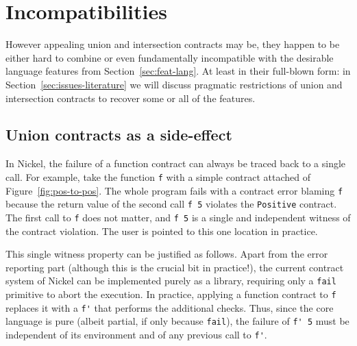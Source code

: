 \documentclass[sigplan,10pt,review,anonymous]{acmart}
\newcommand{\unsure}[2][1=]{}
\newcommand{\nickel}[1]{\lstinline[language=nickel]{#1}}
\begin{document}
\section{Incompatibilities}
\label{sec:issues-sem}

However appealing union and intersection contracts may be, they happen to be
either hard to combine or even fundamentally incompatible with the desirable
language features from Section~\ref{sec:feat-lang}. At least in their full-blown
form: in Section~\ref{sec:issues-literature} we will discuss pragmatic
restrictions of union and intersection contracts to recover some or all of the
features.

\subsection{Union contracts as a side-effect}

In \unsure{Maybe specify its Nickel without Union or inter}Nickel,
the failure of a function contract can always be traced back to a
single call. For example, take the function \nickel{f} with a simple contract
attached of Figure~\ref{fig:pos-to-pos}. The whole program fails with a contract
error blaming \nickel{f} because the return value of the second call \nickel{f 5}
violates the \nickel{Positive} contract. The first call to \nickel{f} does
not matter, and \nickel{f 5} is a single and independent witness of the contract
violation. The user is pointed to this one location in practice.

This single witness property can be justified as follows. Apart from the error
reporting part (although this is the crucial bit in practice!), the current
contract system of Nickel can be implemented purely as a library, requiring only
a \nickel{fail} primitive to abort the execution. In practice, applying a
function contract to \nickel{f} replaces it with a \nickel{f'} that performs the
additional checks. Thus, since the core language is pure (albeit
partial, if only because \nickel{fail}), the failure of \nickel{f' 5}
must be independent of its environment and of any previous call to \nickel{f'}.

%
\end{document}
